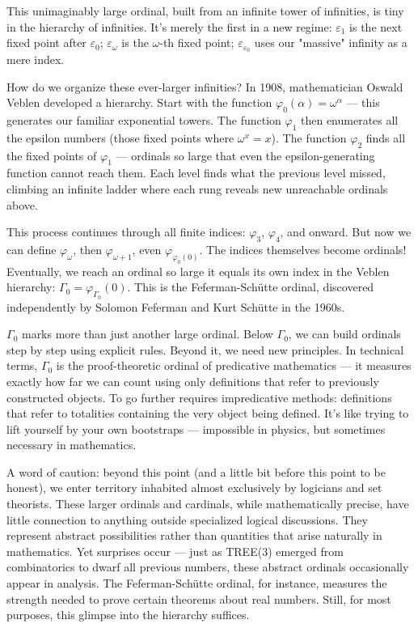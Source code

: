 This unimaginably large ordinal, built from an infinite tower of infinities, is tiny in the hierarchy of infinities. It's merely the first in a new regime:
$\varepsilon_1$ is the next fixed point after $\varepsilon_0$; $\varepsilon_\omega$ is the $\omega$-th fixed point; $\varepsilon_{\varepsilon_0}$ uses our "massive" infinity as a mere index.

How do we organize these ever-larger infinities? In 1908, mathematician Oswald Veblen developed a hierarchy. Start with the function $\varphi_0(\alpha) = \omega^\alpha$ — this generates our familiar exponential towers. The function $\varphi_1$ then enumerates all the epsilon numbers (those fixed points where $\omega^x = x$). The function $\varphi_2$ finds all the fixed points of $\varphi_1$ — ordinals so large that even the epsilon-generating function cannot reach them. Each level finds what the previous level missed, climbing an infinite ladder where each rung reveals new unreachable ordinals above.

This process continues through all finite indices: $\varphi_3$, $\varphi_4$, and onward. But now we can define $\varphi_\omega$, then $\varphi_{\omega+1}$, even $\varphi_{\varphi_0(0)}$. The indices themselves become ordinals! Eventually, we reach an ordinal so large it equals its own index in the Veblen hierarchy: $\Gamma_0 = \varphi_{\Gamma_0}(0)$. This is the Feferman-Schütte ordinal, discovered independently by Solomon Feferman and Kurt Schütte in the 1960s.

$\Gamma_0$ marks more than just another large ordinal. Below $\Gamma_0$, we can build ordinals step by step using explicit rules. Beyond it, we need new principles. In technical terms, $\Gamma_0$ is the proof-theoretic ordinal of predicative mathematics — it measures exactly how far we can count using only definitions that refer to previously constructed objects. To go further requires impredicative methods: definitions that refer to totalities containing the very object being defined. It's like trying to lift yourself by your own bootstraps — impossible in physics, but sometimes necessary in mathematics.

A word of caution: beyond this point (and a little bit before this point to be honest), we enter territory inhabited almost exclusively by logicians and set theorists. These larger ordinals and cardinals, while mathematically precise, have little connection to anything outside specialized logical discussions. They represent abstract possibilities rather than quantities that arise naturally in mathematics. Yet surprises occur — just as TREE(3) emerged from combinatorics to dwarf all previous numbers, these abstract ordinals occasionally appear in analysis. The Feferman-Schütte ordinal, for instance, measures the strength needed to prove certain theorems about real numbers. Still, for most purposes, this glimpse into the hierarchy suffices.


